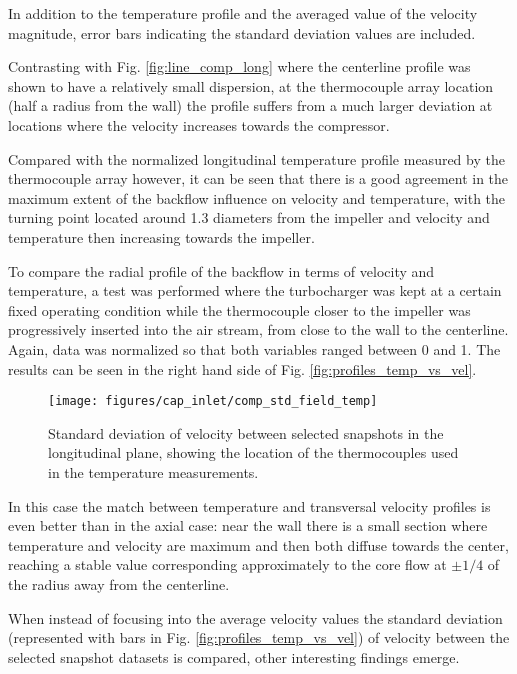 In addition to the temperature profile and the averaged value of the velocity magnitude, error bars indicating the standard deviation values are included. 

Contrasting with Fig. \ref{fig:line_comp_long} where the centerline profile was shown to have a relatively small dispersion, at the thermocouple array location (half a radius from the wall) the profile suffers from a much larger deviation at locations where the velocity increases towards the compressor.

Compared with the normalized longitudinal temperature profile measured by the thermocouple array however, it can be seen that there is a good agreement in the maximum extent of the backflow influence on velocity and temperature, with the turning point located around 1.3 diameters from the impeller and velocity and temperature then increasing towards the impeller.

To compare the radial profile of the backflow in terms of velocity and temperature, a test was performed where the turbocharger was kept at a certain fixed operating condition while the thermocouple closer to the impeller was progressively inserted into the air stream, from close to the wall to the centerline. Again, data was normalized so that both variables ranged between 0 and 1. The results can be seen in the right hand side of Fig. \ref{fig:profiles_temp_vs_vel}.

\begin{figure}[b!]
\centering
\texttt{[image: figures/cap\_inlet/comp\_std\_field\_temp]}
\caption{Standard deviation of velocity between selected snapshots in the longitudinal plane, showing the location of the thermocouples used in the temperature measurements.}
\label{fig:comp_std_field_temp}
\end{figure} 

In this case the match between temperature and transversal velocity profiles is even better than in the axial case: near the wall there is a small section where temperature and velocity are maximum and then both diffuse towards the center, reaching a stable value corresponding approximately to the core flow at $\pm1/4$ of the radius away from the centerline. 

When instead of focusing into the average velocity values the standard deviation (represented with bars in Fig. \ref{fig:profiles_temp_vs_vel}) of velocity between the selected snapshot datasets is compared, other interesting findings emerge.

